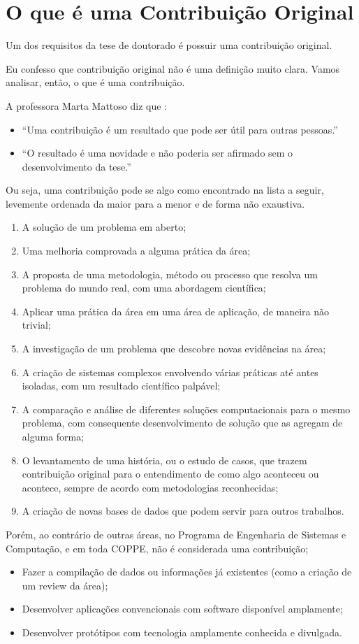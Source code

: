 \section{O que é uma Contribuição Original}

Um dos requisitos da tese de doutorado é possuir uma contribuição original.

Eu confesso que contribuição original não é uma definição muito clara. Vamos analisar, então, o que é uma contribuição.

A professora Marta Mattoso diz que :
\begin{itemize}
\item	“Uma contribuição é um resultado que pode ser útil para outras pessoas.”
\item	“O resultado é uma novidade e não poderia ser afirmado sem o desenvolvimento da tese.”
\end{itemize}

Ou seja, uma contribuição pode se algo como encontrado na lista a seguir, levemente ordenada da maior para a menor e de forma não exaustiva.
\begin{enumerate}
\item	A solução de um problema em aberto;
\item	Uma melhoria comprovada a alguma prática da área;
\item	A proposta de uma metodologia, método ou processo que resolva um problema do mundo real, com uma abordagem científica;
\item	Aplicar uma prática da área em uma área de aplicação, de maneira não trivial;
\item	A investigação de um problema que descobre novas evidências na área;
\item	A criação de sistemas complexos envolvendo várias práticas até antes isoladas, com um resultado científico palpável;
\item	A comparação e análise de diferentes soluções computacionais para o mesmo problema, com consequente desenvolvimento de solução que as agregam de alguma forma;
\item	O levantamento de uma história, ou o estudo de casos, que trazem contribuição original para o entendimento de como algo aconteceu ou acontece, sempre de acordo com metodologias reconhecidas;
\item	A criação de novas bases de dados que podem servir para outros trabalhos.
\end{enumerate}

Porém, ao contrário de outras áreas, no Programa de Engenharia de Sistemas e Computação, e em toda COPPE, não é considerada uma contribuição;
\begin{itemize}
    \item 	Fazer a compilação de dados ou informações já existentes (como a criação de um review da área);
    \item	Desenvolver aplicações convencionais com software disponível amplamente;
    \item 	Desenvolver protótipos com tecnologia amplamente conhecida e divulgada.

\end{itemize}

